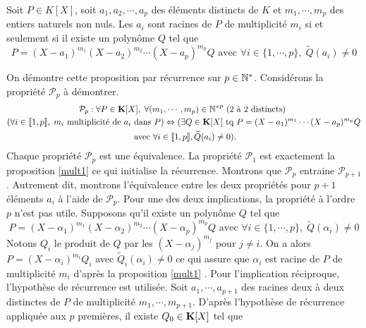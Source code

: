 \begin{propn}\label{multp}
 Soit $P\in K[X]$, soit  $a_1,a_2,\cdots ,a_p$ des éléments distincts de $K$ et $m_1, \cdots,  m_p$ des entiers naturels non nuls. Les $a_i$ sont racines de $P$ de multiplicité $m_i$ si et seulement si il existe un polynôme $Q$ tel que
\begin{displaymath}
 P = (X-a_1)^{m_1}(X-a_2)^{m_2}\cdots(X-a_p)^{m_p} Q \text{ avec }
 \forall i\in\{1,\cdots,p\},\;\widetilde{Q}(a_i)\neq 0 
\end{displaymath}
\end{propn}
\begin{demo}
On démontre cette proposition par récurrence sur $p\in \mathbb{N}^*$. Considérons la propriété $\mathcal{P}_p$ à démontrer.
\begin{multline*}
 \mathcal{P}_p :
 \forall P\in \mathbf{K}[X],\; \forall (m_1, \cdots, m_p)\in {\mathbb{N}^*}^p \text{ (2 à 2 distincts) } \\
\left( \forall i \in \llbracket 1,p \rrbracket,\; m_i \text{ multiplicité de $a_i$ dans $P$}\right) 
\Leftrightarrow
( \exists Q\in \mathbf{K}[X] \text{ tq } P=(X-a_1)^{m_1} \cdots (X-a_p)^{m_p}Q \\ \text{ avec } \forall i \in \llbracket 1,p \rrbracket , \widetilde{Q}(a_i) \neq 0). 
\end{multline*}
Chaque propriété $\mathcal{P}_p$ est une équivalence. La propriété $\mathcal{P}_1$ est exactement la proposition \ref{mult1} ce qui initialise la récurrence.\newline
Montrons que $\mathcal{P}_p$ entraine $\mathcal{P}_{p+1}$. Autrement dit, montrons l'équivalence entre les deux propriétés pour $p+1$ éléments $a_i$ à l'aide de $\mathcal{P}_p$.\newline
Pour une des deux implications, la propriété à l'ordre $p$ n'est pas utile. Supposons qu'il existe un polynôme $Q$ tel que
\begin{displaymath}
 P = (X-\alpha_1)^{m_1}(X-\alpha_2)^{m_2}\cdots(X-\alpha_p)^{m_p} Q \text{ avec }
 \forall i\in\{1,\cdots,p\},\;\widetilde{Q}(\alpha_i)\neq 0 
\end{displaymath}
Notons $Q_i$ le produit de $Q$ par les $(X-\alpha_j)^{m_j}$ pour $j\neq i$. On a alors $P=(X-\alpha_i)^{m_i}Q_i$ avec $\widetilde{Q}_i(\alpha_i)\neq 0$ ce qui assure que $\alpha_i$ est racine de $P$ de multiplicité $m_i$ d'après la proposition \ref{mult1} .\newline
Pour l'implication réciproque, l'hypothèse de récurrence est utilisée.\newline
Soit $a_1,\cdots,a_{p+1}$ des racines deux à deux distinctes de $P$ de multiplicité $m_1, \cdots,m_{p+1}$. D'après l'hypothèse de récurrence appliquée aux $p$ premières, il existe $Q_0 \in \mathbf{K}[X]$ tel que 

\end{demo}
